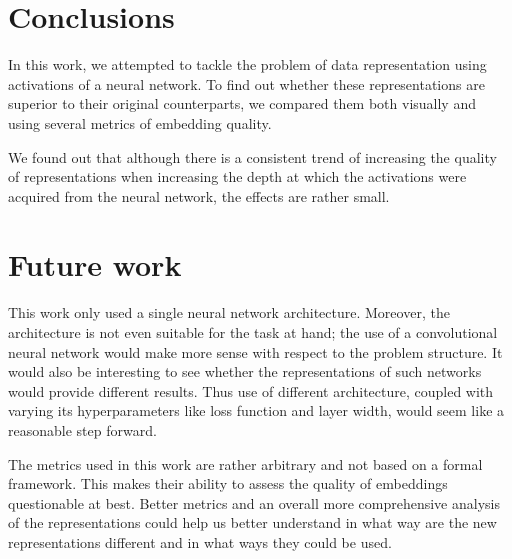 \documentclass{article}
\begin{document}
\section{Conclusions}
In this work, we attempted to tackle the problem of data representation using
activations of a neural network. To find out whether these representations
are superior to their original counterparts, we compared them both visually
and using several metrics of embedding quality.

We found out that although there is a consistent trend of increasing the quality
of representations when increasing the depth at which the activations were
acquired from the neural network, the effects are rather small.

\section{Future work}
This work only used a single neural network architecture. Moreover, the
architecture is not even suitable for the task at hand; the use of
a convolutional neural network would make more sense with respect to the
problem structure. It would also be interesting to see whether the
representations of such networks would provide different results. Thus use
of different architecture, coupled with varying its hyperparameters like
loss function and layer width, would seem like a reasonable step forward.

The metrics used in this work are rather arbitrary and not based on a formal
framework. This makes their ability to assess the quality of embeddings
questionable at best. Better metrics and an overall more comprehensive analysis
of the representations could help us better understand in what way are the new
representations different and in what ways they could be used.
\end{document}
